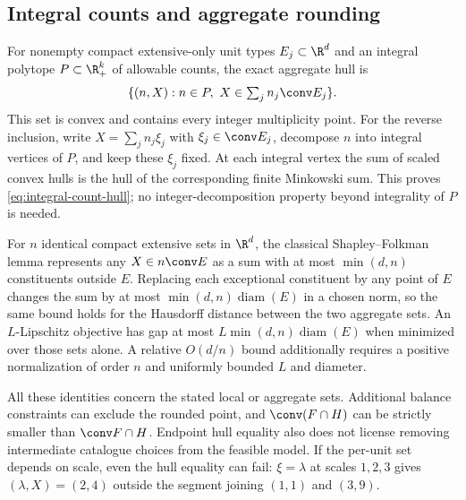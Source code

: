 \subsection{Integral counts and aggregate rounding}
For nonempty compact extensive-only unit types $E_j\subset\R^d$ and an integral polytope
$P\subset\R_+^k$ of allowable counts, the exact aggregate hull is
\begin{equation}\label{eq:integral-count-hull}
 \{(n,X):n\in P,\ X\in\textstyle\sum_j n_j\conv E_j\}.
\end{equation}
This set is convex and contains every integer multiplicity point.
For the reverse inclusion, write $X=\sum_j n_j\xi_j$ with
$\xi_j\in\conv E_j$, decompose $n$ into integral vertices of $P$, and
keep these $\xi_j$ fixed. At each integral vertex the sum of scaled
convex hulls is the hull of the corresponding finite Minkowski sum.
This proves \eqref{eq:integral-count-hull}; no integer-decomposition
property beyond integrality of $P$ is needed.

For $n$ identical compact extensive sets in $\R^d$, the classical
Shapley--Folkman lemma \citep[Appendix 2, Lemma 2 and corollary]{Starr1969}
represents any $X\in n\conv E$ as a sum with at most $\min(d,n)$
constituents outside $E$. Replacing each exceptional constituent by any
point of $E$ changes the sum by at most $\min(d,n)\operatorname{diam}(E)$
in a chosen norm, so the same bound holds for the Hausdorff distance
between the two aggregate sets. An $L$-Lipschitz objective has gap at most
$L\min(d,n)\operatorname{diam}(E)$ when minimized over those sets alone.
A relative $O(d/n)$ bound additionally requires a positive normalization
of order $n$ and uniformly bounded $L$ and diameter.

All these identities concern the stated local or aggregate sets.
Additional balance constraints can exclude the rounded point, and
$\conv(F\cap H)$ can be strictly smaller than $\conv F\cap H$.
Endpoint hull equality also does not license removing intermediate
catalogue choices from the feasible model. If the per-unit set depends
on scale, even the hull equality can fail: $\xi=\lambda$ at scales
$1,2,3$ gives $(\lambda,X)=(2,4)$ outside the segment joining $(1,1)$
and $(3,9)$.
